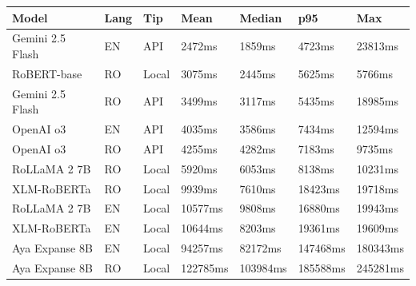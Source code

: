 \begin{tabular}{lllllll}
\toprule
 Model            & Lang   & Tip   & Mean     & Median   & p95      & Max      \\
\midrule
 Gemini 2.5 Flash & EN     & API   & 2472ms   & 1859ms   & 4723ms   & 23813ms  \\
 RoBERT-base      & RO     & Local & 3075ms   & 2445ms   & 5625ms   & 5766ms   \\
 Gemini 2.5 Flash & RO     & API   & 3499ms   & 3117ms   & 5435ms   & 18985ms  \\
 OpenAI o3        & EN     & API   & 4035ms   & 3586ms   & 7434ms   & 12594ms  \\
 OpenAI o3        & RO     & API   & 4255ms   & 4282ms   & 7183ms   & 9735ms   \\
 RoLLaMA 2 7B     & RO     & Local & 5920ms   & 6053ms   & 8138ms   & 10231ms  \\
 XLM-RoBERTa      & RO     & Local & 9939ms   & 7610ms   & 18423ms  & 19718ms  \\
 RoLLaMA 2 7B     & EN     & Local & 10577ms  & 9808ms   & 16880ms  & 19943ms  \\
 XLM-RoBERTa      & EN     & Local & 10644ms  & 8203ms   & 19361ms  & 19609ms  \\
 Aya Expanse 8B   & EN     & Local & 94257ms  & 82172ms  & 147468ms & 180343ms \\
 Aya Expanse 8B   & RO     & Local & 122785ms & 103984ms & 185588ms & 245281ms \\
\bottomrule
\end{tabular}